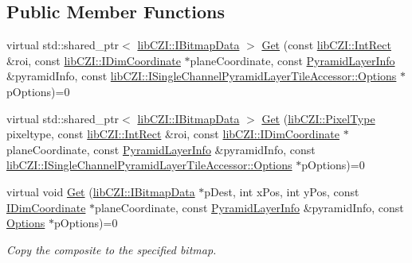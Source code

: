 \subsection*{Public Member Functions}
\begin{DoxyCompactItemize}
\item 
virtual std\+::shared\+\_\+ptr$<$ \hyperlink{classlib_c_z_i_1_1_i_bitmap_data}{lib\+C\+Z\+I\+::\+I\+Bitmap\+Data} $>$ \hyperlink{classlib_c_z_i_1_1_i_single_channel_pyramid_layer_tile_accessor_ac4dd5b960114aa8f87773734d9d78dd3}{Get} (const \hyperlink{structlib_c_z_i_1_1_int_rect}{lib\+C\+Z\+I\+::\+Int\+Rect} \&roi, const \hyperlink{classlib_c_z_i_1_1_i_dim_coordinate}{lib\+C\+Z\+I\+::\+I\+Dim\+Coordinate} $\ast$plane\+Coordinate, const \hyperlink{structlib_c_z_i_1_1_i_single_channel_pyramid_layer_tile_accessor_1_1_pyramid_layer_info}{Pyramid\+Layer\+Info} \&pyramid\+Info, const \hyperlink{structlib_c_z_i_1_1_i_single_channel_pyramid_layer_tile_accessor_1_1_options}{lib\+C\+Z\+I\+::\+I\+Single\+Channel\+Pyramid\+Layer\+Tile\+Accessor\+::\+Options} $\ast$p\+Options)=0
\item 
virtual std\+::shared\+\_\+ptr$<$ \hyperlink{classlib_c_z_i_1_1_i_bitmap_data}{lib\+C\+Z\+I\+::\+I\+Bitmap\+Data} $>$ \hyperlink{classlib_c_z_i_1_1_i_single_channel_pyramid_layer_tile_accessor_a089932803187582a1c19b39b45694fd7}{Get} (\hyperlink{namespacelib_c_z_i_abf8ce12ab88b06c8b3b47efbb5e2e834}{lib\+C\+Z\+I\+::\+Pixel\+Type} pixeltype, const \hyperlink{structlib_c_z_i_1_1_int_rect}{lib\+C\+Z\+I\+::\+Int\+Rect} \&roi, const \hyperlink{classlib_c_z_i_1_1_i_dim_coordinate}{lib\+C\+Z\+I\+::\+I\+Dim\+Coordinate} $\ast$plane\+Coordinate, const \hyperlink{structlib_c_z_i_1_1_i_single_channel_pyramid_layer_tile_accessor_1_1_pyramid_layer_info}{Pyramid\+Layer\+Info} \&pyramid\+Info, const \hyperlink{structlib_c_z_i_1_1_i_single_channel_pyramid_layer_tile_accessor_1_1_options}{lib\+C\+Z\+I\+::\+I\+Single\+Channel\+Pyramid\+Layer\+Tile\+Accessor\+::\+Options} $\ast$p\+Options)=0
\item 
virtual void \hyperlink{classlib_c_z_i_1_1_i_single_channel_pyramid_layer_tile_accessor_a0aff0f380ba7819cf5a4cc239ff7579f}{Get} (\hyperlink{classlib_c_z_i_1_1_i_bitmap_data}{lib\+C\+Z\+I\+::\+I\+Bitmap\+Data} $\ast$p\+Dest, int x\+Pos, int y\+Pos, const \hyperlink{classlib_c_z_i_1_1_i_dim_coordinate}{I\+Dim\+Coordinate} $\ast$plane\+Coordinate, const \hyperlink{structlib_c_z_i_1_1_i_single_channel_pyramid_layer_tile_accessor_1_1_pyramid_layer_info}{Pyramid\+Layer\+Info} \&pyramid\+Info, const \hyperlink{structlib_c_z_i_1_1_i_single_channel_pyramid_layer_tile_accessor_1_1_options}{Options} $\ast$p\+Options)=0
\begin{DoxyCompactList}\small\item\em Copy the composite to the specified bitmap. \end{DoxyCompactList}\end{DoxyCompactItemize}


